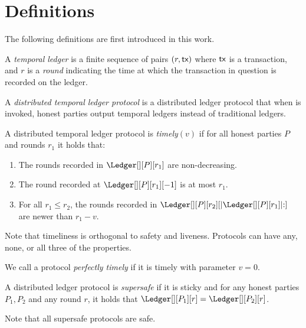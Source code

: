 \section{Definitions}\label{sec:defs}

The following definitions are first introduced in this work.

\begin{definition}
  A \emph{temporal ledger} is a finite sequence of pairs $(r, \textsf{tx})$ where $\textsf{tx}$ is
  a transaction, and $r$ is a \emph{round} indicating the time at which
  the transaction in question is recorded on the ledger.
\end{definition}

\begin{definition}
  A \emph{distributed temporal ledger protocol} is a distributed ledger protocol
  that when \rread is invoked, honest parties output temporal ledgers instead of traditional ledgers.
\end{definition}

\begin{definition}[Timely]\label{def:timely}
  A distributed temporal ledger protocol is \emph{timely}$(v)$
  if for all honest parties $P$ and rounds $r_1$ it holds that:

  \begin{enumerate}
    \item The rounds recorded in $\Ledger[][P][r_1]$ are non-decreasing.\label{def:timely-increasing}
    \item The round recorded at $\Ledger[][P][r_1][-1]$ is at most $r_1$.\label{def:timely-past}
    \item For all $r_1 \leq r_2$, the rounds recorded in $\Ledger[][P][r_2][|\Ledger[][P][r_1]|{:}]$ are
          newer than $r_1 - v$.\label{def:timely-chunk}
  \end{enumerate}
\end{definition}

Note that timeliness is orthogonal to safety and liveness. Protocols can have any, none, or all three
of the properties.

\begin{definition}
  We call a protocol \emph{perfectly timely} if it is timely with parameter $v = 0$.
\end{definition}

\begin{definition}[Supersafety]
  A distributed ledger protocol is \emph{supersafe} if it is sticky and
  for any honest parties $P_1, P_2$ and any round $r$, it holds that
  $\Ledger[][P_1][r] = \Ledger[][P_2][r]$.
\end{definition}

Note that all supersafe protocols are safe.
